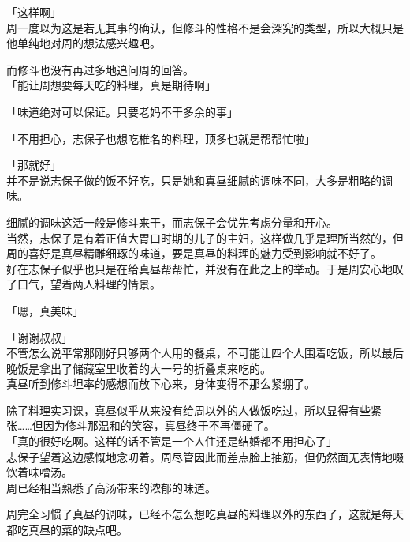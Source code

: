 「这样啊」\\

周一度以为这是若无其事的确认，但修斗的性格不是会深究的类型，所以大概只是他单纯地对周的想法感兴趣吧。

而修斗也没有再过多地追问周的回答。\\

「能让周想要每天吃的料理，真是期待啊」

「味道绝对可以保证。只要老妈不干多余的事」

「不用担心，志保子也想吃椎名的料理，顶多也就是帮帮忙啦」

「那就好」\\

并不是说志保子做的饭不好吃，只是她和真昼细腻的调味不同，大多是粗略的调味。

细腻的调味这活一般是修斗来干，而志保子会优先考虑分量和开心。\\

当然，志保子是有着正值大胃口时期的儿子的主妇，这样做几乎是理所当然的，但周的喜好是真昼精雕细琢的味道，要是真昼的料理的魅力受到影响就不好了。\\

好在志保子似乎也只是在给真昼帮帮忙，并没有在此之上的举动。于是周安心地叹了口气，望着两人料理的情景。\\

\vspace{2\baselineskip}

「嗯，真美味」

「谢谢叔叔」\\

不管怎么说平常那刚好只够两个人用的餐桌，不可能让四个人围着吃饭，所以最后晚饭是拿出了储藏室里收着的大一号的折叠桌来吃的。\\

真昼听到修斗坦率的感想而放下心来，身体变得不那么紧绷了。

除了料理实习课，真昼似乎从来没有给周以外的人做饭吃过，所以显得有些紧张……但因为修斗那温和的笑容，真昼终于不再僵硬了。\\

「真的很好吃啊。这样的话不管是一个人住还是结婚都不用担心了」\\

志保子望着这边感慨地念叨着。周尽管因此而差点脸上抽筋，但仍然面无表情地啜饮着味噌汤。\\

周已经相当熟悉了高汤带来的浓郁的味道。

周完全习惯了真昼的调味，已经不怎么想吃真昼的料理以外的东西了，这就是每天都吃真昼的菜的缺点吧。\\

